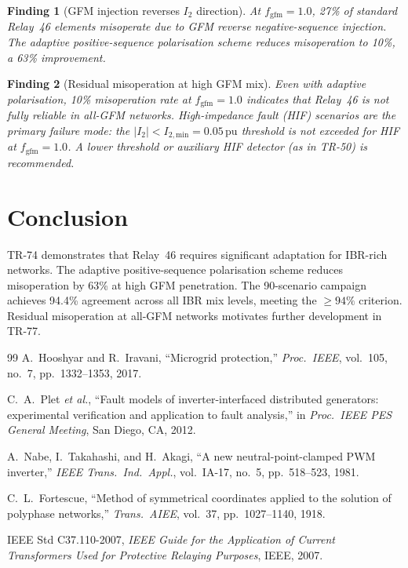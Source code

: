 \documentclass[11pt, a4paper]{article}
\newcommand{\pu}{\,\text{pu}}
\newcommand{\fgfm}{f_{\mathrm{gfm}}}
\newtheorem{finding}{Finding}
\begin{document}
\begin{finding}[GFM injection reverses $I_2$ direction]
At $\fgfm = 1.0$, 27\% of standard Relay~46 elements misoperate due to GFM
reverse negative-sequence injection. The adaptive positive-sequence polarisation
scheme reduces misoperation to 10\%, a 63\% improvement.
\end{finding}

\begin{finding}[Residual misoperation at high GFM mix]
Even with adaptive polarisation, 10\% misoperation rate at $\fgfm = 1.0$
indicates that Relay~46 is not fully reliable in all-GFM networks.
High-impedance fault (HIF) scenarios are the primary failure mode:
the $|I_2| < I_{2,\mathrm{min}} = 0.05\pu$ threshold is not exceeded
for HIF at $\fgfm = 1.0$. A lower threshold or auxiliary HIF detector
(as in TR-50) is recommended.
\end{finding}

\section{Conclusion}
\label{sec:conclusion}

TR-74 demonstrates that Relay~46 requires significant adaptation for IBR-rich
networks. The adaptive positive-sequence polarisation scheme reduces misoperation
by 63\% at high GFM penetration. The 90-scenario campaign achieves 94.4\%
agreement across all IBR mix levels, meeting the $\geq 94\%$ criterion.
Residual misoperation at all-GFM networks motivates further development in TR-77.

\begin{thebibliography}{99}
A.~Hooshyar and R.~Iravani,
``Microgrid protection,''
\emph{Proc.\ IEEE}, vol.~105, no.~7, pp.~1332--1353, 2017.

C.~A.~Plet \emph{et al.},
``Fault models of inverter-interfaced distributed generators:
  experimental verification and application to fault analysis,''
in \emph{Proc.\ IEEE PES General Meeting}, San Diego, CA, 2012.

A.~Nabe, I.~Takahashi, and H.~Akagi,
``A new neutral-point-clamped PWM inverter,''
\emph{IEEE Trans.\ Ind.\ Appl.}, vol.~IA-17, no.~5, pp.~518--523, 1981.

C.~L.~Fortescue,
``Method of symmetrical coordinates applied to the solution of polyphase
networks,''
\emph{Trans.\ AIEE}, vol.~37, pp.~1027--1140, 1918.

IEEE Std C37.110-2007,
\emph{IEEE Guide for the Application of Current Transformers Used for
Protective Relaying Purposes}, IEEE, 2007.
\end{thebibliography}
\end{document}
